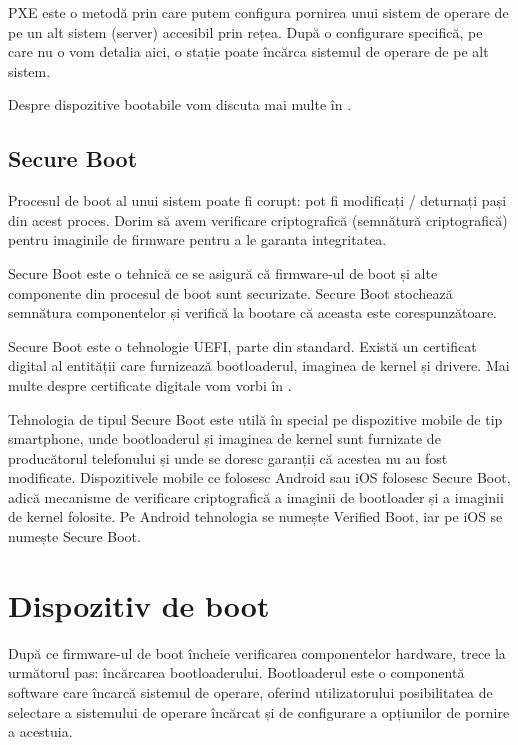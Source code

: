 PXE este o metodă prin care putem configura pornirea unui sistem de operare de
pe un alt sistem (server) accesibil prin rețea. După o configurare specifică, pe
care nu o vom detalia aici, o stație poate încărca sistemul de operare de pe
alt sistem.

Despre dispozitive bootabile vom discuta mai multe în
.

\subsection{Secure Boot}
\label{sec:boot:secure-boot}

Procesul de boot al unui sistem poate fi corupt: pot fi modificați / deturnați
pași din acest proces. Dorim să avem verificare criptografică (semnătură
criptografică) pentru imaginile de firmware pentru a le garanta integritatea.

Secure Boot este o tehnică ce se asigură că firmware-ul de boot și alte componente
din procesul de boot sunt securizate. Secure Boot stochează semnătura
componentelor și verifică la bootare că aceasta este corespunzătoare.

Secure Boot este o tehnologie UEFI, parte din standard. Există un certificat digital al
entității care furnizează bootloaderul, imaginea de kernel și drivere. Mai
multe despre certificate digitale vom vorbi în .

Tehnologia de tipul Secure Boot este utilă în special pe dispozitive mobile de
tip smartphone, unde bootloaderul și imaginea de kernel sunt furnizate de
producătorul telefonului și unde se doresc garanții că acestea nu au fost modificate.
Dispozitivele mobile ce folosesc Android sau iOS folosesc Secure Boot, adică
mecanisme de verificare criptografică a imaginii de bootloader și a imaginii de
kernel folosite. Pe Android tehnologia se numește Verified Boot, iar pe iOS se
numește Secure Boot.

\section{Dispozitiv de boot}
\label{sec:boot:bootdev}

După ce firmware-ul de boot încheie verificarea componentelor hardware, trece la următorul
pas: încărcarea bootloaderului. Bootloaderul este o componentă software care
încarcă sistemul de operare, oferind utilizatorului posibilitatea de selectare a
sistemului de operare încărcat și de configurare a opțiunilor de pornire a
acestuia.

